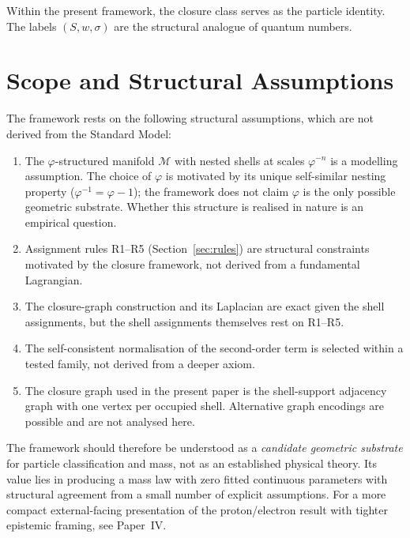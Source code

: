 \documentclass[12pt]{article}
\newcommand{\Mcal}{\mathcal{M}}
\newcommand{\phig}{\varphi}
\begin{document}
Within the present framework, the closure class serves as the particle identity. The labels $(S, w, \sigma)$ are the structural analogue of quantum numbers.

\section{Scope and Structural Assumptions}\label{sec:assumptions}

The framework rests on the following structural assumptions, which are not derived from the Standard Model:

\begin{enumerate}
    \item The $\phig$-structured manifold $\Mcal$ with nested shells at scales $\phig^{-n}$ is a modelling assumption. The choice of $\phig$ is motivated by its unique self-similar nesting property ($\phig^{-1} = \phig - 1$); the framework does not claim $\phig$ is the only possible geometric substrate. Whether this structure is realised in nature is an empirical question.
    \item Assignment rules R1--R5 (Section~\ref{sec:rules}) are structural constraints motivated by the closure framework, not derived from a fundamental Lagrangian.
    \item The closure-graph construction and its Laplacian are exact given the shell assignments, but the shell assignments themselves rest on R1--R5.
    \item The self-consistent normalisation of the second-order term is selected within a tested family, not derived from a deeper axiom.
    \item The closure graph used in the present paper is the shell-support adjacency graph with one vertex per occupied shell. Alternative graph encodings are possible and are not analysed here.
\end{enumerate}

The framework should therefore be understood as a \textit{candidate geometric substrate} for particle classification and mass, not as an established physical theory. Its value lies in producing a mass law with zero fitted continuous parameters with structural agreement from a small number of explicit assumptions. For a more compact external-facing presentation of the proton/electron result with tighter epistemic framing, see Paper~IV.
\end{document}
